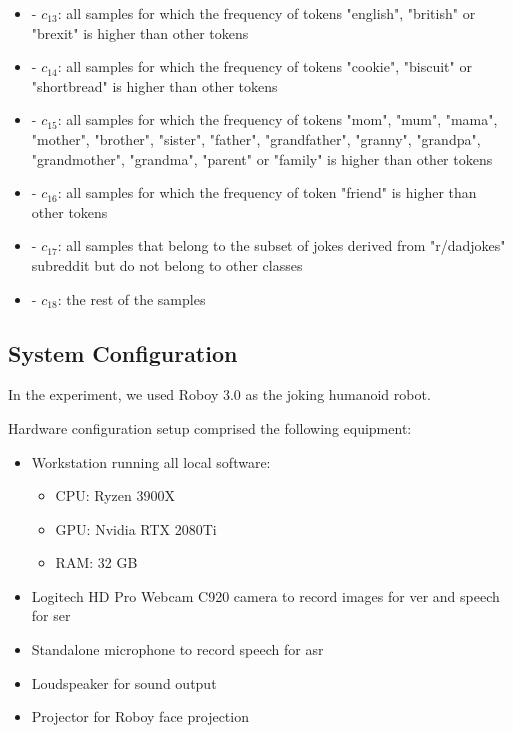 \begin{itemize}
\begin{itemize}
        \item <|british|> - \( c_13\): all samples for which the frequency of tokens "english", "british" or "brexit" is higher than other tokens
        \item <|cookie|> - \( c_14\): all samples for which the frequency of tokens "cookie", "biscuit" or "shortbread" is higher than other tokens
        \item <|family|> - \( c_15\): all samples for which the frequency of tokens "mom", "mum", "mama", "mother", "brother", "sister", "father", "grandfather", "granny", "grandpa", "grandmother", "grandma", "parent" or "family" is higher than other tokens
        \item <|friend|> - \( c_16\): all samples for which the frequency of token "friend" is higher than other tokens
        \item <|dadjokes|> - \( c_17\): all samples that belong to the subset of jokes derived from "r/dadjokes" subreddit but do not belong to other classes
        \item <|other|>  - \( c_18\): the rest of the samples
    \end{itemize}
\end{itemize}

\subsection{System Configuration}

In the experiment, we used Roboy 3.0 as the joking humanoid robot.

Hardware configuration setup comprised the following equipment:
\begin{itemize}
    \item Workstation running all local software:
    \begin{itemize}
        \item CPU: Ryzen 3900X
        \item GPU: Nvidia RTX 2080Ti
        \item RAM: 32 GB
    \end{itemize}
    \item Logitech HD Pro Webcam C920 camera to record images for \acrshort{ver} and speech for \acrshort{ser}
    \item Standalone microphone to record speech for \acrshort{asr}
    \item Loudspeaker for sound output 
    \item Projector for Roboy face projection
\end{itemize}

